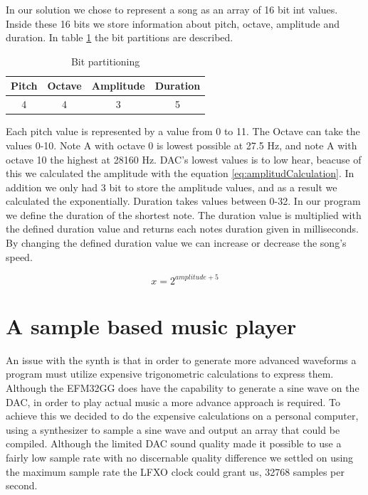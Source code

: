In our solution we chose to represent a song as an array of 16 bit int values. Inside these 16 bits we store information about pitch, octave, amplitude and duration. In table \ref{tab:bitFields} the bit partitions are described.
\begin{table}[H]
	\begin{center}
	\begin{tabular}{ |c|c|c|c| }
	  \hline
	  Pitch & Octave & Amplitude & Duration \\
	  \hline
	  4 & 4 & 3 & 5 \\
	  \hline

	\end{tabular}
	\caption{Bit partitioning}
	\label{tab:bitFields}
	\end{center}
\end{table}

Each pitch value is represented by a value from 0 to 11. The Octave can take the values 0-10. Note A with octave 0 is lowest possible at 27.5 Hz, and note A with octave 10 the highest at 28160 Hz. DAC's lowest values is to low hear, beacuse of this we calculated the amplitude with the equation \ref{eq:amplitudCalculation}. In addition we only had 3 bit to store the amplitude values, and as a result we calculated the exponentially. Duration takes values between 0-32. In our program we define the duration of the shortest note. The duration value is multiplied with the defined duration value and returns each notes duration given in milliseconds. By changing the defined duration value we can increase or decrease the song's speed.

\begin{equation}
  x = 2^{amplitude + 5}
  \label{eq:amplitudCalculation}
\end{equation}


\section{A sample based music player}
An issue with the synth is that in order to generate more advanced waveforms a program must utilize expensive trigonometric calculations to express them. Although the EFM32GG does have the capability to generate a sine wave on the DAC, in order to play actual music a more advance approach is required. To achieve this we decided to do the expensive calculations on a personal computer, using a synthesizer to sample a sine wave and output an array that could be compiled. Although the limited DAC sound quality made it possible to use a fairly low sample rate with no discernable quality difference we settled on using the maximum sample rate the LFXO clock could grant us, 32768 samples per second. 

